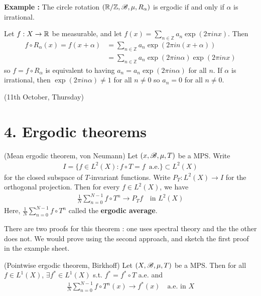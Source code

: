 \documentclass[12pt,a4paper]{report}
\newenvironment{proof}
{\begin{changemargin}{1cm}{0.5cm} 
	}%
	{\end{changemargin}
}
\begin{document}
\textbf{Example :} The circle rotation $(\mathbb{R}/\mathbb{Z},\mathscr{B}, \mu, R_{\alpha})$ is ergodic if and only if $\alpha$ is irrational.

\begin{proof}
\pf Let $f:X\rightarrow \mathbb{R}$ be measurable, and let $f(x) = \sum_{n\in \mathbb{Z}} a_n \exp(2\pi i nx)$. Then
\begin{align*}
f\circ R_{\alpha}(x) = f(x+\alpha) &= \sum_{n\in \mathbb{Z}}a_n \exp(2\pi in (x+\alpha)) \\
&= \sum_{n\in \mathbb{Z}} a_n \exp(2\pi in\alpha) \exp(2\pi i nx)
\end{align*}
so $f=f\circ R_{\alpha}$ is equivalent to having $a_n = a_n \exp(2\pi i n \alpha)$ for all $n$.
If $\alpha$ is irrational, then $\exp(2\pi in\alpha) \neq 1$ for all $n\neq 0$ so $a_n=0$ for all $n\neq 0$.

\eop
\end{proof}
\s

\newday

(11th October, Thursday)
\s

\section*{4. Ergodic theorems}

\thm (Mean ergodic theorem, von Neumann) Let $(x,\mathscr{B}, \mu, T)$ be a MPS. Write
\begin{align*}
I = \{ f\in L^2(X) : f\circ T = f \,\,\, \text{a.e.} \}  \subset L^2(X)
\end{align*}
for the closed subspace of $T$-invariant functions. Write $P_T : L^2(X) \rightarrow I$ for the orthogonal projection. Then for every $f\in L^2(X)$, we have
\begin{align*}
\frac{1}{N} \sum_{n=0}^{N-1} f\circ T^n \rightarrow P_T f \quad \text{in } L^2(X)
\end{align*}
Here, $\frac{1}{N} \sum_{n=0}^{N-1} f\circ T^n$ called the \textbf{ergodic average}.
\s

There are two proofs for this theorem : one uses spectral theory and the the other does not. We would prove using the second approach, and sketch the first proof in the example sheet.

\s

\thm (Pointwise ergodic theorem, Birkhoff) Let $(X,\mathscr{B}, \mu, T)$ be a MPS. Then for all $f\in L^1(X)$, $\exists f^* \in L^1(X)$ s.t. $f^* = f^* \circ T$ a.e. and 
\begin{align*}
\frac{1}{N} \sum_{n=0}^{N-1} f\circ T^n (x) \rightarrow f^*(x) \quad \text{a.e. in } X 
\end{align*}
\s
\end{document}
